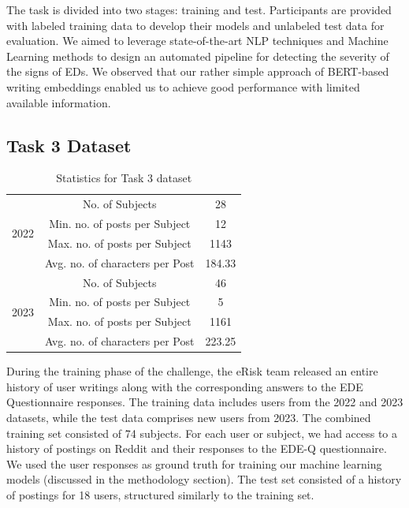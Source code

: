 \documentclass[]{style/ceurart}
\begin{document}
The task is divided into two stages: training and test. Participants are provided with labeled training data to develop their models and unlabeled test data for evaluation. We aimed to leverage state-of-the-art NLP techniques and Machine Learning methods to design an automated pipeline for detecting the severity of the signs of EDs. We observed that our rather simple approach of BERT-based writing embeddings enabled us to achieve good performance with limited available information.


\subsection{Task 3 Dataset}

\begin{table}[h!]
\centering
\caption{Statistics for Task 3 dataset}
\begin{tabular}{|c|c|c|}
\hline
\multirow{4}{*}{2022} & No. of Subjects                 & 28     \\ \cline{2-3} 
                      & Min. no. of posts per Subject   & 12     \\ \cline{2-3} 
                      & Max. no. of posts per Subject   & 1143   \\ \cline{2-3} 
                      & Avg. no. of characters per Post & 184.33 \\ \hline
\multirow{4}{*}{2023} & No. of Subjects                 & 46     \\ \cline{2-3} 
                      & Min. no. of posts per Subject   & 5      \\ \cline{2-3} 
                      & Max. no. of posts per Subject   & 1161   \\ \cline{2-3} 
                      & Avg. no. of characters per Post & 223.25 \\ \hline
\end{tabular}
\end{table}

During the training phase of the challenge, the eRisk team released an entire history of user writings along with the corresponding answers to the EDE Questionnaire responses. The training data includes users from the 2022 and 2023 datasets, while the test data comprises new users from 2023. The combined training set consisted of 74 subjects. For each user or subject, we had access to a history of postings on Reddit and their responses to the EDE-Q questionnaire. We used the user responses as ground truth for training our machine learning models (discussed in the methodology section). The test set consisted of a history of postings for 18 users, structured similarly to the training set.
\end{document}

